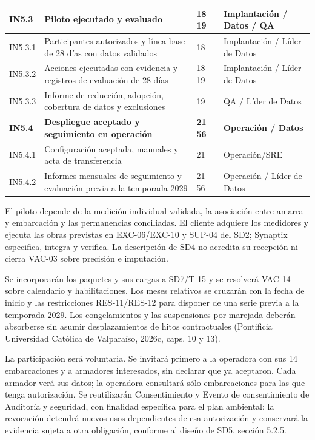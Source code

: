 \begin{longtable}{
L{\tabcolsep\relax}
L{\tabcolsep\relax}
L{\tabcolsep\relax}
L{\tabcolsep\relax}
}
\textbf{IN5.3} &
\textbf{Piloto ejecutado y evaluado} &
\textbf{18--19} &
\textbf{Implantación / Datos / QA} \\
\hline
IN5.3.1 & Participantes autorizados y línea base
de 28 días con datos validados &
18 & Implantación / Líder de Datos \\
\hline
IN5.3.2 & Acciones ejecutadas con evidencia
y registros de evaluación de 28 días &
18--19 & Implantación / Líder de Datos \\
\hline
IN5.3.3 & Informe de reducción, adopción,
cobertura de datos y exclusiones &
19 & QA / Líder de Datos \\
\hline

\textbf{IN5.4} &
\textbf{Despliegue aceptado y seguimiento en operación} &
\textbf{21--56} &
\textbf{Operación / Datos} \\
\hline
IN5.4.1 & Configuración aceptada, manuales
y acta de transferencia &
21 & Operación/SRE \\
\hline
IN5.4.2 & Informes mensuales de seguimiento
y evaluación previa a la temporada 2029 &
21--56 & Operación / Líder de Datos \\
\hline
\end{longtable}


El piloto depende de la medición individual validada, la asociación
entre amarra y embarcación y las permanencias conciliadas.
El cliente adquiere los medidores y ejecuta las obras previstas
en EXC-06/EXC-10 y SUP-04 del SD2; Synaptix especifica, integra
y verifica. La descripción de SD4 no acredita su recepción
ni cierra VAC-03 sobre precisión e imputación.

Se incorporarán los paquetes y sus cargas a SD7/T-15 y se resolverá
VAC-14 sobre calendario y habilitaciones. Los meses relativos
se cruzarán con la fecha de inicio y las restricciones RES-11/RES-12
para disponer de una serie previa a la temporada 2029.
Los congelamientos y las suspensiones por marejada deberán
absorberse sin asumir desplazamientos de hitos contractuales
(Pontificia Universidad Católica de Valparaíso, 2026c,
caps. 10 y 13).

La participación será voluntaria. Se invitará primero a la
operadora con sus 14 embarcaciones y a armadores interesados,
sin declarar que ya aceptaron. Cada armador verá sus datos;
la operadora consultará sólo embarcaciones para las que tenga
autorización. Se reutilizarán Consentimiento y Evento de
consentimiento de Auditoría y seguridad, con finalidad específica
para el plan ambiental; la revocación detendrá nuevos usos
dependientes de esa autorización y conservará la evidencia
sujeta a otra obligación, conforme al diseño de SD5, sección 5.2.5.

